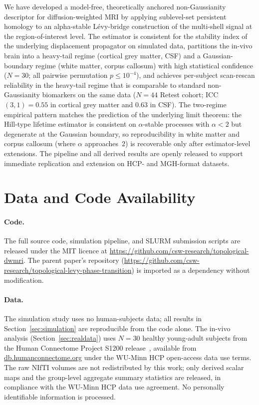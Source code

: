 \documentclass[11pt,letterpaper]{article}
\newcommand{\stab}{\alpha}
\begin{document}
We have developed a model-free, theoretically anchored
non-Gaussianity descriptor for diffusion-weighted MRI by applying
sublevel-set persistent homology to an alpha-stable L\'evy-bridge
construction of the multi-shell signal at the region-of-interest
level. The estimator is consistent for the stability index of the
underlying displacement propagator on simulated data, partitions the
in-vivo brain into a heavy-tail regime (cortical grey matter, CSF)
and a Gaussian-boundary regime (white matter, corpus callosum) with
high statistical confidence ($N=30$; all pairwise permutation
$p\le 10^{-4}$), and achieves per-subject scan-rescan reliability in
the heavy-tail regime that is comparable to standard non-Gaussianity
biomarkers on the same data ($N=44$ Retest cohort; ICC$(3,1)=0.55$
in cortical grey matter and $0.63$ in CSF). The two-regime
empirical pattern matches the prediction of the underlying limit
theorem: the Hill-type lifetime estimator is consistent on
$\stab$-stable processes with $\stab<2$ but degenerate at the
Gaussian boundary, so reproducibility in white matter and corpus
callosum (where $\stab$ approaches~$2$) is recoverable only after
estimator-level extensions. The pipeline and all derived results
are openly released to support immediate replication and extension
on HCP- and MGH-format datasets.

\section*{Data and Code Availability}

\paragraph*{Code.}
The full source code, simulation pipeline, and SLURM submission
scripts are released under the MIT licence at
\url{https://github.com/csw-research/topological-dwmri}. The parent
paper's repository
(\url{https://github.com/csw-research/topological-levy-phase-transition})
is imported as a dependency without modification.

\paragraph*{Data.}
The simulation study uses no human-subjects data; all results in
Section~\ref{sec:simulation} are reproducible from the code alone.
The in-vivo analysis (Section~\ref{sec:realdata}) uses $N=30$
healthy young-adult subjects from the Human Connectome Project
S1200 release~\citep{vanessen2013wu}, available from
\url{db.humanconnectome.org} under the WU-Minn HCP open-access data
use terms. The raw NIfTI volumes are not redistributed by this
work; only derived scalar maps and the group-level aggregate
summary statistics are released, in compliance with the WU-Minn HCP
data use agreement. No personally identifiable information is
processed.
\end{document}
